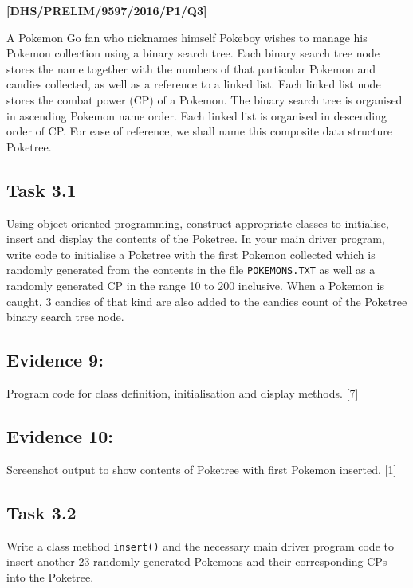 \item \textbf{{[}DHS/PRELIM/9597/2016/P1/Q3{]} }

A Pokemon Go fan who nicknames himself Pokeboy wishes to manage his
Pokemon collection using a binary search tree. Each binary search
tree node stores the name together with the numbers of that particular
Pokemon and candies collected, as well as a reference to a linked
list. Each linked list node stores the combat power (CP) of a Pokemon.
The binary search tree is organised in ascending Pokemon name order.
Each linked list is organised in descending order of CP. For ease
of reference, we shall name this composite data structure Poketree. 

\subsection*{Task 3.1 }

Using object-oriented programming, construct appropriate classes to
initialise, insert and display the contents of the Poketree. In your
main driver program, write code to initialise a Poketree with the
first Pokemon collected which is randomly generated from the contents
in the file \texttt{POKEMONS.TXT} as well as a randomly generated
CP in the range 10 to 200 inclusive. When a Pokemon is caught, 3 candies
of that kind are also added to the candies count of the Poketree binary
search tree node.

\subsection*{Evidence 9: }

Program code for class definition, initialisation and display methods.\hfill{}
{[}7{]}

\subsection*{Evidence 10:}

Screenshot output to show contents of Poketree with first Pokemon
inserted.\hfill{} {[}1{]}

\subsection*{Task 3.2 }

Write a class method \texttt{insert()} and the necessary main driver
program code to insert another 23 randomly generated Pokemons and
their corresponding CPs into the Poketree. 

